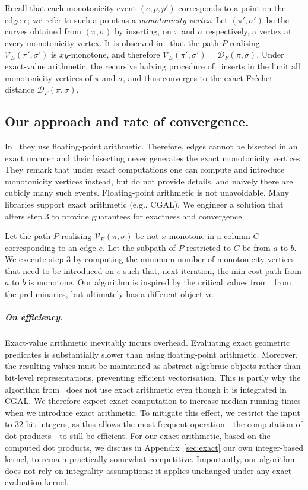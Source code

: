 \documentclass[10pt,a4paper]{article}
\newcommand{\fd}{\mathcal{D}_F}
\newcommand{\ve}{\mathcal{V}_E}
\begin{document}
Recall that each monotonicity event $(e,p,p')$ corresponds to a point on the edge $e$; we refer to such a point as a \emph{monotonicity vertex}.  
Let $(\pi',\sigma')$ be the curves obtained from $(\pi,\sigma)$ by inserting, on $\pi$ and $\sigma$ respectively, a vertex at every monotonicity vertex.
It is observed in~\cite{harpeled_et_al:LIPIcs.SoCG.2025.54} that the path $P$ realising $\ve(\pi',\sigma')$ is $xy$-monotone, and therefore $
  \ve(\pi',\sigma') = \fd(\pi,\sigma).$
Under exact-value arithmetic, the recursive halving procedure of~\cite{harpeled_et_al:LIPIcs.SoCG.2025.54} inserts in the limit all monotonicity vertices of $\pi$ and $\sigma$, and thus converges to the exact Fréchet distance $\fd(\pi,\sigma)$.


\subsection{Our approach and rate of convergence.}

In~\cite{harpeled_et_al:LIPIcs.SoCG.2025.54} they use floating-point arithmetic. 
Therefore,  edges cannot be bisected in an exact manner and their bisecting never generates the exact monotonicity vertices. 
They remark that under exact computations one can compute and introduce monotonicity vertices instead, but do not provide details, and naively there are cubicly many such events. 
Floating-point arithmetic is not unavoidable. Many libraries support exact arithmetic (e.g., CGAL). We engineer a solution that alters step 3 to provide guarantees for exactness and convergence. 

Let the path $P$ realising $\ve(\pi, \sigma)$ be not $x$-monotone in a column $C$ corresponding to an edge $e$. 
Let the subpath of $P$ restricted to $C$ be from $a$ to $b$. We execute step 3 by computing the minimum number of monotonicity vertices that need to be introduced on $e$ such that, next iteration, the min-cost path from  $a$ to $b$ is monotone.
Our algorithm is inspired by the critical values from~\cite{alt1995computing, HarPeled2011Frechet} from the preliminaries, but ultimately has a different objective.

\subparagraph{On efficiency.}
Exact-value arithmetic inevitably incurs overhead.  
Evaluating exact geometric predicates is substantially slower than using floating-point arithmetic. Moreover, the resulting values must be maintained as abstract algebraic objects rather than bit-level representations, preventing efficient vectorisation. This is partly why the algorithm from~\cite{bringmann2019Walking} does not use exact arithmetic even though it is integrated in CGAL. 
We therefore expect exact computation to increase median running times when we introduce exact arithmetic. 
To mitigate this effect, we restrict the input to $32$-bit integers, as this allows the most frequent operation---the computation of dot products---to still be efficient. For our exact arithmetic, based on the computed dot products, we discuss in Appendix~\ref{sec:exact} our own integer-based kernel, to remain practically somewhat competitive. 
Importantly, our algorithm does not rely on integrality assumptions: it applies unchanged under any exact-evaluation kernel.
\end{document}
